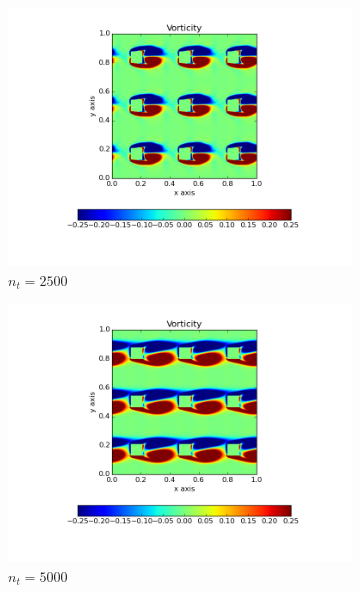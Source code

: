 \documentclass[10pt, a4paper]{article}
\begin{document}
\begin{figure}[htb!]
\centering
\begin{subfigure}{.5\textwidth}
  \centering
  \includegraphics[width=1.1\linewidth, clip=true, trim=1cm 1cm 1cm 1cm]{q4_0001}
  \caption{$n_t = 2500$}
  \label{fig:sub1}
\end{subfigure}%
\begin{subfigure}{.5\textwidth}
  \centering
  \includegraphics[width=1.1\linewidth, clip=true, trim=1cm 1cm 1cm 1cm]{q4_0002}
  \caption{$n_t = 5000$}
  \label{fig:sub2}
\end{subfigure}
\newline
\begin{subfigure}{.5\textwidth}
  \centering

\end{subfigure}
\end{figure}
\end{document}
